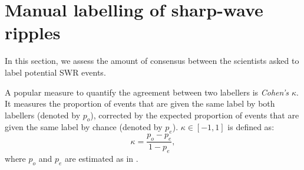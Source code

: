 
\section{Manual labelling of sharp-wave ripples}


In this section, we assess the amount of consensus between the scientists asked to label potential SWR events.

A popular measure to quantify the agreement between two labellers is \emph{Cohen's $\kappa$}. It measures the proportion of events that are given the same label by both labellers (denoted by $p_o$), corrected by the expected proportion of events that are given the same label by chance (denoted by $p_e$). $\kappa \in [-1, 1]$ is defined as:
\begin{equation}
\kappa = \frac{p_o - p_e}{1 - p_e},
\end{equation}
%
where $p_o$ and $p_e$ are estimated as in \cite{McHugh2012}.

\begin{figure}
\label{fig:labellers_A}
\end{figure}

